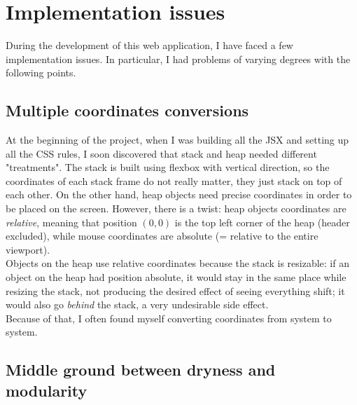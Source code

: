 \documentclass[]{usiinfbachelorproject}
\begin{document}
\vspace{\fill}

\pagebreak

\section{Implementation issues} \label{issues}


During the development of this web application, I have faced a few implementation issues. In particular, I had problems of varying degrees with the following points.

\subsection{Multiple coordinates conversions}

At the beginning of the project, when I was building all the JSX and setting up all the CSS rules, I soon discovered that stack and heap needed different "treatments". The stack is built using flexbox with vertical direction, so the coordinates of each stack frame do not really matter, they just stack on top of each other. On the other hand, heap objects need precise coordinates in order to be placed on the screen. However, there is a twist: heap objects coordinates are \emph{relative}, meaning that position ${(0,0)}$ is the top left corner of the heap (header excluded), while mouse coordinates are absolute (= relative to the entire viewport).\\
Objects on the heap use relative coordinates because the stack is resizable: if an object on the heap had position absolute, it would stay in the same place while resizing the stack, not producing the desired effect of seeing everything shift; it would also go \emph{behind} the stack, a very undesirable side effect.\\
Because of that, I often found myself converting coordinates from system to system.

\subsection{Middle ground between dryness and modularity}
\end{document}
